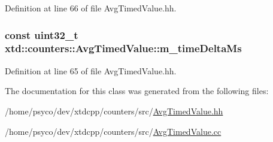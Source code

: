 Definition at line 66 of file Avg\+Timed\+Value.\+hh.

\subsubsection[{\texorpdfstring{m\+\_\+time\+Delta\+Ms}{m_timeDeltaMs}}]{\setlength{\rightskip}{0pt plus 5cm}const uint32\+\_\+t xtd\+::counters\+::\+Avg\+Timed\+Value\+::m\+\_\+time\+Delta\+Ms}\hypertarget{classxtd_1_1counters_1_1AvgTimedValue_a2986c9cf3526f6f86d340dafd25ae04f}{}\label{classxtd_1_1counters_1_1AvgTimedValue_a2986c9cf3526f6f86d340dafd25ae04f}


Definition at line 65 of file Avg\+Timed\+Value.\+hh.



The documentation for this class was generated from the following files\+:\begin{DoxyCompactItemize}
\item 
/home/psyco/dev/xtdcpp/counters/src/\hyperlink{AvgTimedValue_8hh}{Avg\+Timed\+Value.\+hh}\item 
/home/psyco/dev/xtdcpp/counters/src/\hyperlink{AvgTimedValue_8cc}{Avg\+Timed\+Value.\+cc}\end{DoxyCompactItemize}
